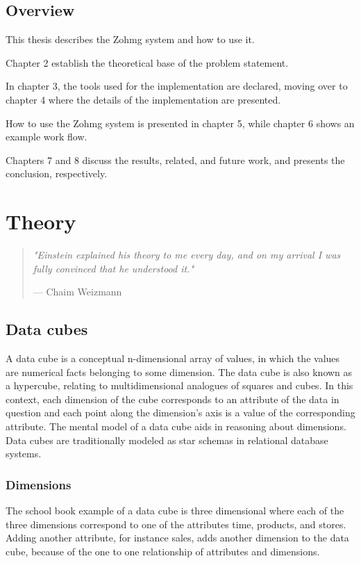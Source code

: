 \documentclass[a4paper,10pt]{book}
\newcommand{\chapterquote}[2] {
\begin{quote}
\textit{"{#1}"}

--- {#2}
\end{quote}

\vspace{24pt}
}
\begin{document}
\section{Overview}

This thesis describes the Zohmg system and how to use it.

Chapter 2 establish the theoretical base of the problem statement.

In chapter 3, the tools used for the implementation are declared, moving
over to chapter 4 where the details of the implementation are presented.

How to use the Zohmg system is presented in chapter 5, while chapter 6
shows an example work flow.

Chapters 7 and 8 discuss the results, related, and future work, and
presents the conclusion, respectively.




\chapter{Theory}

\chapterquote{Einstein explained his theory to me every day, and on my
arrival I was fully convinced that he understood it.}{Chaim Weizmann}


\section{Data cubes}

A data cube is a conceptual n-dimensional array of values, in which the values
are numerical facts belonging to some dimension. The data cube is also known as
a hypercube, relating to multidimensional analogues of squares and cubes. In
this context, each dimension of the cube corresponds to an attribute of the
data in question and each point along the dimension's axis is a value of the
corresponding attribute. The mental model of a data cube aids in reasoning
about dimensions. Data cubes are traditionally modeled as star schemas in
relational database systems. \cite{olap_solutions}


\subsection{Dimensions}

The school book example of a data cube is three dimensional where each of
the three dimensions correspond to one of the attributes time, products,
and stores. Adding another attribute, for instance sales, adds another
dimension to the data cube, because of the one to one relationship of
attributes and dimensions.
\end{document}
